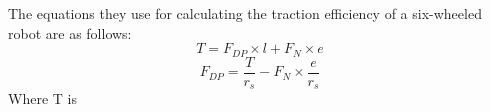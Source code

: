 \par The equations they use for calculating the traction efficiency of a six-wheeled robot are as follows:
    \begin{equation}
        T = F_{DP} \times l + F_{N} \times e
    \end{equation}
    \begin{equation}
        F_{DP} = \frac{T}{ r_{s}} - F_{N} \times \frac{e}{r_{s}}
    \end{equation}
Where T is 